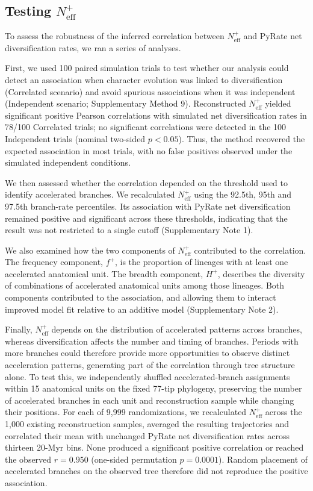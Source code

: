 \documentclass[10pt,a4paper]{article}
\begin{document}
\subsection*{Testing \(N_{\mathrm{eff}}^{+}\)}

To assess the robustness of the inferred correlation between \(N_{\mathrm{eff}}^{+}\) and PyRate net diversification rates, we ran a series of analyses.

First, we used 100 paired simulation trials to test whether our analysis could detect an association when character evolution was linked to diversification (Correlated scenario) and avoid spurious associations when it was independent (Independent scenario; Supplementary Method 9). Reconstructed \(N_{\mathrm{eff}}^{+}\) yielded significant positive Pearson correlations with simulated net diversification rates in 78/100 Correlated trials; no significant correlations were detected in the 100 Independent trials (nominal two-sided \(p<0.05\)). Thus, the method recovered the expected association in most trials, with no false positives observed under the simulated independent conditions.

We then assessed whether the correlation depended on the threshold used to identify accelerated branches. We recalculated \(N_{\mathrm{eff}}^{+}\) using the 92.5th, 95th and 97.5th branch-rate percentiles. Its association with PyRate net diversification remained positive and significant across these thresholds, indicating that the result was not restricted to a single cutoff (Supplementary Note 1).

We also examined how the two components of \(N_{\mathrm{eff}}^{+}\) contributed to the correlation. The frequency component, \(f^{+}\), is the proportion of lineages with at least one accelerated anatomical unit. The breadth component, \(H^{+}\), describes the diversity of combinations of accelerated anatomical units among those lineages. Both components contributed to the association, and allowing them to interact improved model fit relative to an additive model (Supplementary Note 2).

Finally, \(N_{\mathrm{eff}}^{+}\) depends on the distribution of accelerated patterns across branches, whereas diversification affects the number and timing of branches. Periods with more branches could therefore provide more opportunities to observe distinct acceleration patterns, generating part of the correlation through tree structure alone. To test this, we independently shuffled accelerated-branch assignments within 15 anatomical units on the fixed 77-tip phylogeny, preserving the number of accelerated branches in each unit and reconstruction sample while changing their positions. For each of 9,999 randomizations, we recalculated \(N_{\mathrm{eff}}^{+}\) across the 1,000 existing reconstruction samples, averaged the resulting trajectories and correlated their mean with unchanged PyRate net diversification rates across thirteen 20-Myr bins. None produced a significant positive correlation or reached the observed \(r=0.950\) (one-sided permutation \(p=0.0001\)). Random placement of accelerated branches on the observed tree therefore did not reproduce the positive association.
\end{document}
